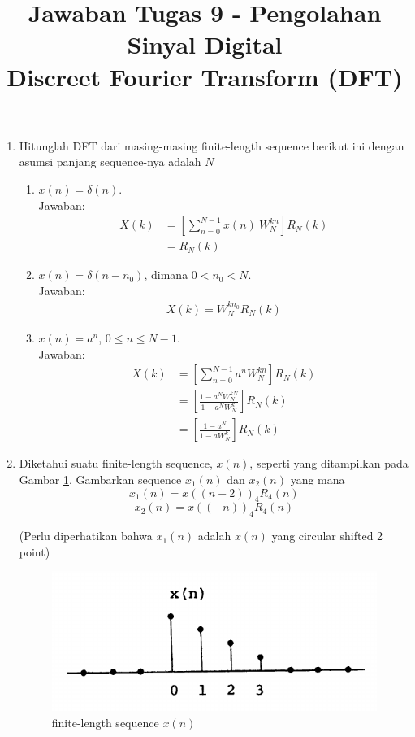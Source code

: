 \documentclass[12pt,a4paper]{article}
\title{Jawaban Tugas 9 - Pengolahan Sinyal Digital\\
	Discreet Fourier Transform (DFT)}
\date{}
\begin{document}
	\maketitle
	\date{}
	\begin{enumerate}
		\item Hitunglah DFT dari masing-masing finite-length sequence berikut ini dengan asumsi panjang sequence-nya adalah $ N $
		\begin{enumerate}
			\item $ x(n)=\delta(n) $. \\
			Jawaban:
			\begin{align*}
				X(k) &= \left[ \sum\limits_{n=0}^{N-1} x(n)~ W_N^{kn} \right] R_N (k) \\
				&= R_N (k)
			\end{align*}
			
			\item $ x(n)=\delta(n-n_{0}) $, dimana $ 0<n_{0}<N $. \\
			Jawaban:
			\begin{align*}
				X(k) = W_N^{kn_0} R_N(k)
			\end{align*}
			\item $ x(n)=a^{n} $, $ 0\leq n\leq N-1 $.\\
			Jawaban:
			\begin{align*}
				X(k) &= \left[ \sum\limits_{n=0}^{N-1}a^n W_N^{kn} \right] R_N(k) \\
				&= \left[ \frac{1-a^N W_N^{kN}}{1-a^N W_N^{k}} \right] R_N(k) \\
				&= \left[ \frac{1-a^N}{1-a W_N^{k}} \right] R_N(k)
			\end{align*}
		\end{enumerate}
		
		\item Diketahui suatu finite-length sequence, $ x(n) $, seperti yang ditampilkan pada Gambar \ref{fig:img01}. Gambarkan sequence $ x_1(n) $ dan $ x_2(n) $ yang mana \[ x_1(n) = x((n-2))_4 R_4(n) \] \[ x_2(n) = x((-n))_4 R_4(n) \]
		
		(Perlu diperhatikan bahwa $ x_1(n) $ adalah $ x(n) $ yang circular shifted 2 point)\\
		
		\begin{figure}[H]
			\centering
			\includegraphics[width=0.5\linewidth]{img/img01}
			\caption{finite-length sequence $ x(n) $}
			\label{fig:img01}
		\end{figure}
		

\end{enumerate}
\end{document}
